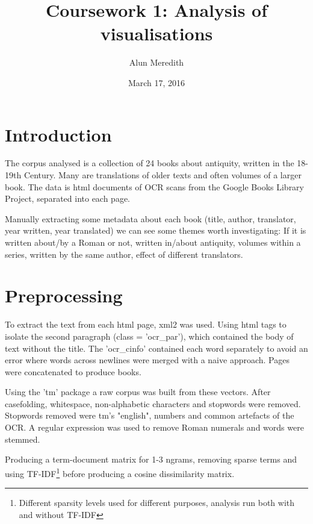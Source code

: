 \documentclass[a4paper,10pt, twocolumn]{article}
\begin{document}
\setlength{\droptitle}{-100pt}
\author{Alun Meredith\vspace{-2ex}%
}
\date{March 17, 2016 \vspace{-4ex}}
\title{Coursework 1: Analysis of visualisations\vspace{-2ex}%
}
\maketitle
\small

\section{Introduction}
The corpus analysed is a collection of 24 books about antiquity, written in the 18-19th Century. Many are translations of older texts and often volumes of a larger book. The data is html documents of OCR scans from the Google Books Library Project, separated into each page.

Manually extracting some metadata about each book (title, author, translator, year written, year translated) we can see some themes worth investigating: If it is written about/by a Roman or not, written in/about antiquity, volumes within a series, written by the same author, effect of different translators.
\section{Preprocessing}
To extract the text from each html page, xml2 was used. Using html tags to isolate the second paragraph (class = 'ocr\_par'), which contained the body of text without the title. The 'ocr\_cinfo' contained each word separately to avoid an error where words across newlines were merged with a naive approach. Pages were concatenated to produce books.

Using the 'tm' package a raw corpus was built from these vectors. After casefolding, whitespace, non-alphabetic characters and stopwords were removed. Stopwords removed were tm's "english", numbers and common artefacts of the OCR. A regular expression was used to remove Roman numerals and words were stemmed.

Producing a term-document matrix for 1-3 ngrams, removing sparse terms and using TF-IDF\footnote{Different sparsity levels used for different purposes, analysis run both with and without TF-IDF} before producing a cosine dissimilarity matrix. 
\end{document}
